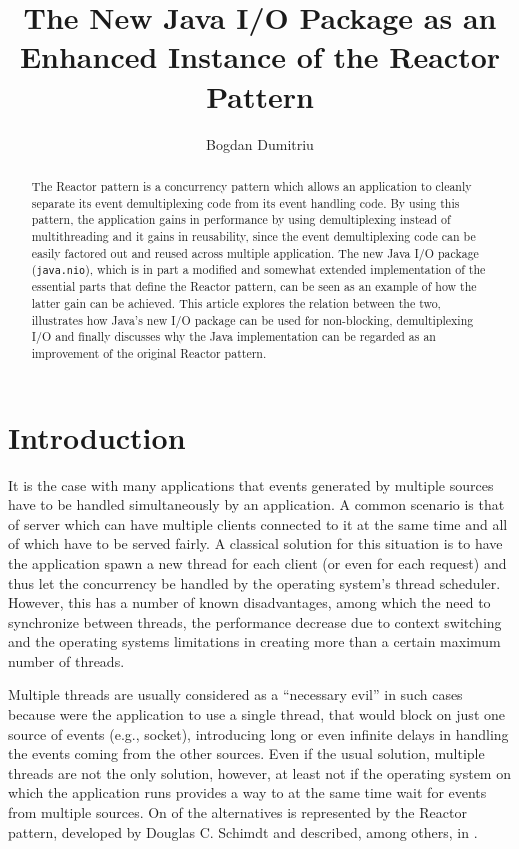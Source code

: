 \documentclass[a4paper,10pt]{article}
\title{The New Java I/O Package as an Enhanced Instance of the Reactor Pattern}
\author{Bogdan Dumitriu}
\begin{document}


\maketitle

\begin{abstract}
The Reactor pattern is a concurrency pattern which allows an application to cleanly
separate its event demultiplexing code from its event handling code. By using this
pattern, the application gains in performance by using demultiplexing instead of
multithreading and it gains in reusability, since the event demultiplexing code can
be easily factored out and reused across multiple application. The new Java I/O package
(\texttt{java.nio}), which is in part a modified and somewhat extended implementation
of the essential parts that define the Reactor pattern, can be seen as an example of how
the latter gain can be achieved. This article explores the relation between the two, illustrates how
Java's new I/O package can be used for non-blocking, demultiplexing I/O and finally
discusses why the Java implementation can be regarded as an improvement of the
original Reactor pattern.
\end{abstract}

\section{Introduction}

It is the case with many applications that events generated by multiple sources have to be handled
simultaneously by an application. A common scenario is that of server which can have multiple
clients connected to it at the same time and all of which have to be served fairly. A classical
solution for this situation is to have the application spawn a new thread for each client (or even for
each request) and thus let the concurrency be handled by the operating system's thread scheduler.
However, this has a number of known disadvantages, among which the need to synchronize between
threads, the performance decrease due to context switching and the operating systems limitations
in creating more than a certain maximum number of threads.

Multiple threads are usually considered as a ``necessary evil'' in such cases because were the application
to use a single thread, that would block on just one source of events (e.g., socket), introducing long
or even infinite delays in handling the events coming from the other sources. Even if the usual solution,
multiple threads are not the only solution, however, at least not if the operating system on which the
application runs provides a way to at the same time wait for events from multiple sources. On of the
alternatives is represented by the Reactor pattern, developed by Douglas C. Schimdt and described, among
others, in \cite{218705, 226255}.
\end{document}
